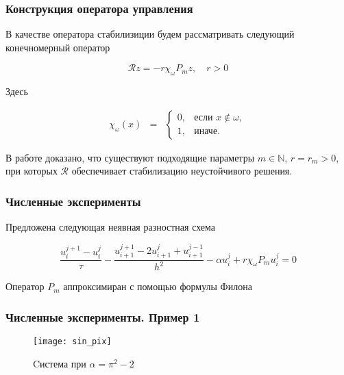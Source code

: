 \documentclass{beamer}
\newcommand{\operator}[1]{\mathcal{R}{#1}}
\begin{document}
\begin{frame}
\frametitle{Конструкция оператора управления}

В качестве оператора стабилизиции будем рассматривать следующий конечномерный оператор

\begin{block}{}
\begin{equation}
	\operator{z} = -r\chi_{\omega}P_mz, \quad r > 0
\end{equation}
\end{block}
Здесь 
\begin{block}{}
	\begin{equation}
    \begin{matrix}
	    \chi_{\omega}(x) & =
	    & \left\{
	    \begin{matrix}
	    0, & \mbox{если } x \notin \omega, \\
	    1, & \mbox{иначе. }
	    \end{matrix} \right.
	    \end{matrix}
    \end{equation}
\end{block}

В работе доказано, что существуют подходящие параметры $m \in \mathbb{N}$, $r = r_m > 0$, при которых $\operator{}$ обеспечивает стабилизацию неустойчивого решения.

\end{frame}


\begin{frame}
\frametitle{Численные эксперименты}
Предложена следующая неявная разностная схема \\
\begin{block}{}
	\begin{equation}\label{scheme}
		\frac{u^{j + 1}_i - u^j_i}{\tau} - \frac{u_{i + 1}^{j + 1} - 2u_{i + 1}^{j} + u_{i + 1}^{j - 1}}{h^2} - \alpha u^j_i + r\chi_{\omega}P_m u^j_i = 0
	\end{equation}
\end{block}

Оператор $P_m$ аппроксимиран с помощью формулы Филона\\

\end{frame}



\begin{frame}
\frametitle{Численные эксперименты. Пример 1}

\begin{figure}[H]
  \centering
  \texttt{[image: sin\_pix]}
  \def\figurename{рис}
  \caption{Cистема при $\alpha = \pi^2 - 2$}
\end{figure}

\end{frame}
\end{document}
